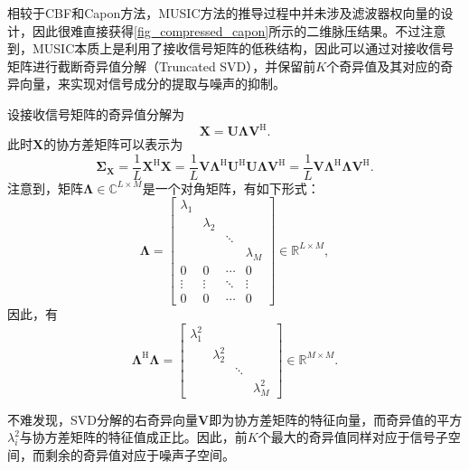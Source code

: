 相较于CBF和Capon方法，MUSIC方法的推导过程中并未涉及滤波器权向量的设计，因此很难直接获得\cref{fig_compressed_capon}所示的二维脉压结果。不过注意到，MUSIC本质上是利用了接收信号矩阵的低秩结构，因此可以通过对接收信号矩阵进行截断奇异值分解（Truncated SVD），并保留前\( K \)个奇异值及其对应的奇异向量，来实现对信号成分的提取与噪声的抑制。

设接收信号矩阵的奇异值分解为
\[
    \mathbf{X} = \mathbf{U} \mathbf{\Lambda} \mathbf{V}^{\mathrm{H}}.
\]
此时\( \mathbf{X} \)的协方差矩阵可以表示为
\[
    \mathbf{\Sigma}_{\mathbf{X}} = \frac{1}{L} \mathbf{X}^{\mathrm{H}} \mathbf{X} = \frac{1}{L} \mathbf{V} \mathbf{\Lambda}^{\mathrm{H}} \mathbf{U}^{\mathrm{H}} \mathbf{U} \mathbf{\Lambda} \mathbf{V}^{\mathrm{H}} = \frac{1}{L} \mathbf{V} \mathbf{\Lambda}^{\mathrm{H}} \mathbf{\Lambda} \mathbf{V}^{\mathrm{H}}.
\]
注意到，矩阵\( \mathbf{\Lambda} \in \mathbb{C}^{L \times M} \)是一个对角矩阵，有如下形式：
\[
    \mathbf{\Lambda} = \begin{bmatrix}
        \lambda_1 &           &        &           \\
                  & \lambda_2 &        &           \\
                  &           & \ddots &           \\
                  &           &        & \lambda_M \\
        0         & 0         & \cdots & 0         \\
        \vdots    & \vdots    & \ddots & \vdots    \\
        0         & 0         & \cdots & 0
    \end{bmatrix} \in \mathbb{R}^{L \times M},
\]
因此，有
\[
    \mathbf{\Lambda}^{\mathrm{H}} \mathbf{\Lambda} = \begin{bmatrix}
        \lambda_1^2 &             &        &             \\
                    & \lambda_2^2 &        &             \\
                    &             & \ddots &             \\
                    &             &        & \lambda_M^2
    \end{bmatrix} \in \mathbb{R}^{M \times M}.
\]

不难发现，SVD分解的右奇异向量\( \mathbf{V} \)即为协方差矩阵的特征向量，而奇异值的平方\( \lambda_i^2 \)与协方差矩阵的特征值成正比。因此，前\( K \)个最大的奇异值同样对应于信号子空间，而剩余的奇异值对应于噪声子空间。

